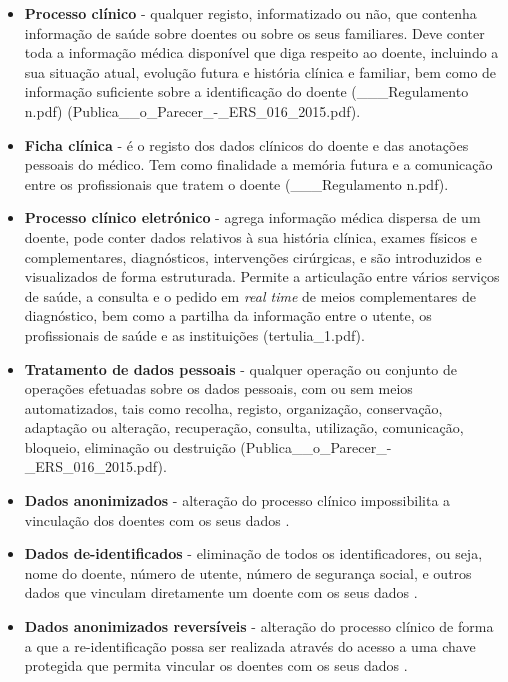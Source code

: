 \documentclass{article}
\begin{document}
\begin{multicols}{2}
\begin{itemize}
	\item \textbf{Processo clínico} - qualquer registo, informatizado ou não, que contenha informação de saúde sobre doentes ou sobre os seus familiares. Deve conter toda a informação médica disponível que diga respeito ao doente, incluindo a sua situação atual, evolução futura e história clínica e familiar, bem como de informação suficiente sobre a identificação do doente (___Regulamento n.pdf) (Publica__o_Parecer_-_ERS_016_2015.pdf). 
	
	\item \textbf{Ficha clínica} - é o registo dos dados clínicos do doente e das anotações pessoais do médico. Tem como finalidade a memória futura e a comunicação entre os profissionais que tratem o doente (___Regulamento n.pdf).
	
	\item \textbf{Processo clínico eletrónico} - agrega informação médica dispersa de um doente, pode conter dados relativos à sua história clínica, exames físicos e complementares, diagnósticos, intervenções cirúrgicas, e são introduzidos e visualizados de forma estruturada. Permite a articulação entre vários serviços de saúde, a consulta e o pedido em \textit{real time} de meios complementares de diagnóstico, bem como a partilha da informação entre o utente, os profissionais de saúde e as instituições (tertulia_1.pdf).
	
	\item \textbf{Tratamento de dados pessoais} - qualquer operação ou conjunto de operações efetuadas sobre os dados pessoais, com ou sem meios automatizados, tais como recolha, registo, organização, conservação, adaptação ou alteração, recuperação, consulta, utilização, comunicação, bloqueio, eliminação ou destruição (Publica__o_Parecer_-_ERS_016_2015.pdf).
	
	\item \textbf{Dados anonimizados} - alteração do processo clínico impossibilita a vinculação dos doentes com os seus dados \cite{safran2007toward}.
	
	\item \textbf{Dados de-identificados} - eliminação de todos os identificadores, ou seja, nome do doente, número de utente, número de segurança social, e outros dados que vinculam diretamente um doente com os seus dados \cite{safran2007toward}.
	
	\item \textbf{Dados anonimizados reversíveis} - alteração do processo clínico de forma a que a re-identificação possa ser realizada através do acesso a uma chave protegida que permita vincular os doentes com os seus dados \citep{safran2007toward}.
	

\end{itemize}
\end{multicols}
\end{document}
